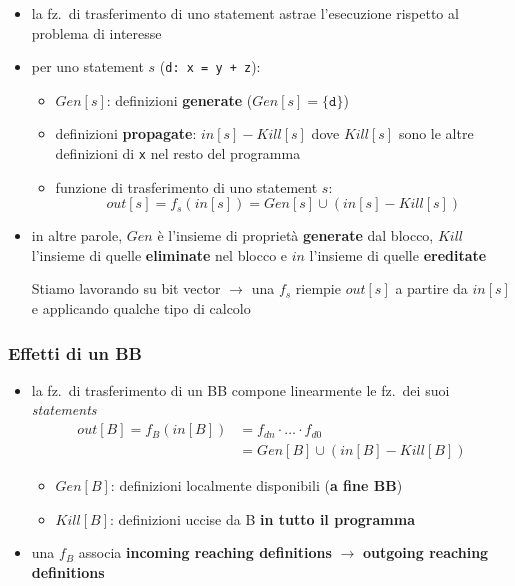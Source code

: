 \begin{itemize}
  \item la fz.~di trasferimento di uno statement astrae l'esecuzione rispetto al problema di interesse
  \item per uno statement $s$ (\lstinline|d: x = y + z|):
    \begin{itemize}
      \item $Gen[s]$: definizioni \textbf{generate} ($Gen[s] = \lbrace\texttt{d}\rbrace$)
      \item definizioni \textbf{propagate}: $in[s] - Kill[s]$ dove $Kill[s]$ sono le altre definizioni di \lstinline|x| nel resto del programma
      \item funzione di trasferimento di uno statement $s$:
        \begin{equation*}
          out[s] = f_{s}(in[s]) = Gen[s] \cup (in[s] - Kill[s]) 
        \end{equation*}

    \end{itemize}

  \item in altre parole, $Gen$ \`e l'insieme di propriet\`a \textbf{generate} dal blocco, $Kill$ l'insieme di quelle \textbf{eliminate} nel blocco e $in$ l'insieme di quelle \textbf{ereditate}
    \begin{emphasize}
      Stiamo lavorando su bit vector $\rightarrow$ una $f_{s}$ riempie $out[s]$ a partire da $in[s]$ e applicando qualche tipo di calcolo
    \end{emphasize}
\end{itemize}

\vspace{-2em}
\subsubsection{Effetti di un BB}

\begin{itemize}
  \item la fz.~di trasferimento di un BB compone linearmente le fz.~dei suoi \textit{statements}
    \begin{equation*}
      \begin{split}
        \boxed{out[B]} = f_{B}(in[B]) &= f_{dn}\cdot\ldots\cdot f_{d0} \\
                                      &= \boxed{Gen[B] \cup (in[B] - Kill[B])}
      \end{split}
    \end{equation*}
    \begin{itemize}
      \item $Gen[B]$: definizioni localmente disponibili (\textbf{a fine BB})
      \item $Kill[B]$: definizioni uccise da B \textbf{in tutto il programma}
    \end{itemize}
  \item una $f_{B}$ associa \textbf{incoming reaching definitions} $\rightarrow$ \textbf{outgoing reaching definitions}
\end{itemize}

